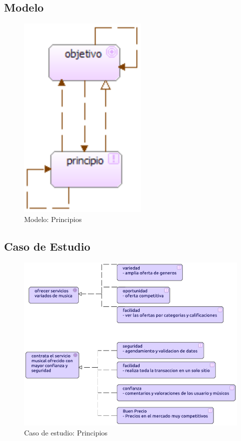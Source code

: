 \subsection{Modelo}
\begin{figure}[h!]
	\centering
	\includegraphics[width=0.4\linewidth]{Arquitectura/Motivacion/imgs/PrincipiosMetamodelo.PNG}
	\caption{Modelo: Principios}
\end{figure}
\newpage
\subsection{Caso de Estudio}
\begin{figure}[h!]
	\centering
	\includegraphics[width=\linewidth]{Arquitectura/Motivacion/imgs/Principios.pdf}
	\caption{Caso de estudio: Principios}
	\label{fig:comportamiento}
\end{figure}

